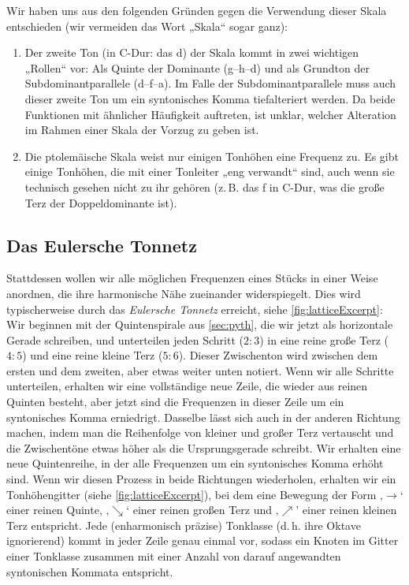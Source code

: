 Wir haben uns aus den folgenden Gründen gegen die Verwendung dieser Skala
entschieden (wir vermeiden das Wort „Skala“ sogar ganz):
\begin{enumerate}
\item Der zweite Ton (in C-Dur: das d) der Skala kommt in zwei wichtigen
  „Rollen“ vor: Als Quinte der Dominante (g–h–d) und als Grundton der
  Subdominantparallele (d–f–a). Im Falle der Subdominantparallele muss auch
  dieser zweite Ton um ein syntonisches Komma tiefalteriert werden. Da beide
  Funktionen mit ähnlicher Häufigkeit auftreten, ist unklar, welcher Alteration
  im Rahmen einer Skala der Vorzug zu geben ist.
\item Die ptolemäische Skala weist nur einigen Tonhöhen eine Frequenz zu. Es
  gibt einige Tonhöhen, die mit einer Tonleiter „eng verwandt“ sind, auch wenn
  sie technisch gesehen nicht zu ihr gehören (z.\,B. das \sharp f in C-Dur, was
  die große Terz der Doppeldominante ist).
\end{enumerate}

\subsection{Das Eulersche Tonnetz}

Stattdessen wollen wir alle möglichen Frequenzen eines Stücks in einer Weise
anordnen, die ihre harmonische Nähe zueinander widerspiegelt. Dies wird
typischerweise durch das \emph{Eulersche Tonnetz} erreicht, siehe
\cref{fig:latticeExcerpt}: Wir beginnen mit der Quintenspirale aus
\cref{sec:pyth}, die wir jetzt als horizontale Gerade schreiben, und unterteilen
jeden Schritt ($2:3$) in eine reine große Terz ($4:5$) und eine reine kleine
Terz ($5:6$). Dieser Zwischenton wird zwischen dem ersten und dem zweiten, aber
etwas weiter unten notiert. Wenn wir alle Schritte unterteilen, erhalten wir
eine vollständige neue Zeile, die wieder aus reinen Quinten besteht, aber jetzt
sind die Frequenzen in dieser Zeile um ein syntonisches Komma
erniedrigt. Dasselbe lässt sich auch in der anderen Richtung machen, indem man
die Reihenfolge von kleiner und großer Terz vertauscht und die Zwischentöne
etwas höher als die Ursprungsgerade schreibt. Wir erhalten eine neue
Quintenreihe, in der alle Frequenzen um ein syntonisches Komma erhöht sind. Wenn
wir diesen Prozess in beide Richtungen wiederholen, erhalten wir ein
Tonhöhengitter (siehe \cref{fig:latticeExcerpt}), bei dem eine Bewegung der Form
‚$\to$‘ einer reinen Quinte, ‚$\searrow$‘ einer reinen großen Terz und
‚$\nearrow$’ einer reinen kleinen Terz entspricht. Jede (enharmonisch präzise)
Tonklasse (d.\,h. ihre Oktave ignorierend) kommt in jeder Zeile genau einmal
vor, sodass ein Knoten im Gitter einer Tonklasse zusammen mit einer Anzahl von
darauf angewandten syntonischen Kommata entspricht.%

